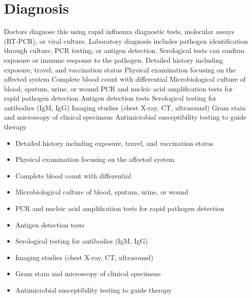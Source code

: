 \section{Diagnosis}
Doctors diagnose this using rapid influenza diagnostic tests, molecular assays (RT-PCR), or viral culture. Laboratory diagnosis includes pathogen identification through culture, PCR testing, or antigen detection. Serological tests can confirm exposure or immune response to the pathogen. Detailed history including exposure, travel, and vaccination status Physical examination focusing on the affected system Complete blood count with differential Microbiological culture of blood, sputum, urine, or wound PCR and nucleic acid amplification tests for rapid pathogen detection Antigen detection tests Serological testing for antibodies (IgM, IgG) Imaging studies (chest X-ray, CT, ultrasound) Gram stain and microscopy of clinical specimens Antimicrobial susceptibility testing to guide therapy

\begin{itemize}[noitemsep]
  \item Detailed history including exposure, travel, and vaccination status
  \item Physical examination focusing on the affected system
  \item Complete blood count with differential
  \item Microbiological culture of blood, sputum, urine, or wound
  \item PCR and nucleic acid amplification tests for rapid pathogen detection
  \item Antigen detection tests
  \item Serological testing for antibodies (IgM, IgG)
  \item Imaging studies (chest X-ray, CT, ultrasound)
  \item Gram stain and microscopy of clinical specimens
  \item Antimicrobial susceptibility testing to guide therapy
\end{itemize}
